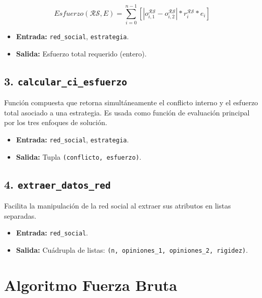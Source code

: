 \documentclass[11pt,letter]{article}
\begin{document}
    \[
        Esfuerzo(\mathcal{RS}, E) = \sum_{i=0}^{n-1} \left[ \left| o^{\mathcal{RS}}_{i,1} - o^{\mathcal{RS}}_{i,2} \right| * r^{\mathcal{RS}}_i * e_i \right]
    \]


    \begin{itemize}
        \item \textbf{Entrada:} \texttt{red\_social}, \texttt{estrategia}.
        \item \textbf{Salida:} Esfuerzo total requerido (entero).
    \end{itemize}

    \subsection*{3. \texttt{calcular\_ci\_esfuerzo}}
    \label{sec:calcular_ci_esfuerzo}
    Función compuesta que retorna simultáneamente el conflicto interno y el esfuerzo total asociado a una estrategia. Es usada como función de evaluación principal por los tres enfoques de solución.

    \begin{itemize}
        \item \textbf{Entrada:} \texttt{red\_social}, \texttt{estrategia}.
        \item \textbf{Salida:} Tupla \texttt{(conflicto, esfuerzo)}.
    \end{itemize}

    \subsection*{4. \texttt{extraer\_datos\_red}}
    Facilita la manipulación de la red social al extraer sus atributos en listas separadas.

    \begin{itemize}
        \item \textbf{Entrada:} \texttt{red\_social}.
        \item \textbf{Salida:} Cuádrupla de listas: \texttt{(n, opiniones\_1, opiniones\_2, rigidez)}.
    \end{itemize}

    \newpage


    \section{Algoritmo Fuerza Bruta}
\end{document}
